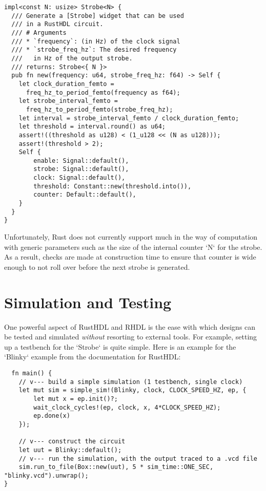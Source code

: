 \documentclass[conference]{IEEEtran}
\begin{document}
\begin{verbatim}
impl<const N: usize> Strobe<N> {
  /// Generate a [Strobe] widget that can be used 
  /// in a RustHDL circuit.
  /// # Arguments
  /// * `frequency`: (in Hz) of the clock signal 
  /// * `strobe_freq_hz`: The desired frequency 
  ///   in Hz of the output strobe.  
  /// returns: Strobe<{ N }>
  pub fn new(frequency: u64, strobe_freq_hz: f64) -> Self {
    let clock_duration_femto = 
      freq_hz_to_period_femto(frequency as f64);
    let strobe_interval_femto = 
      freq_hz_to_period_femto(strobe_freq_hz);
    let interval = strobe_interval_femto / clock_duration_femto;
    let threshold = interval.round() as u64;
    assert!((threshold as u128) < (1_u128 << (N as u128)));
    assert!(threshold > 2);
    Self {
        enable: Signal::default(),
        strobe: Signal::default(),
        clock: Signal::default(),
        threshold: Constant::new(threshold.into()),
        counter: Default::default(),
    }
  }
}
\end{verbatim}

Unfortunately, Rust does not currently support much in the way of computation with generic parameters such as the 
size of the internal counter `N` for the strobe.  As a result, checks are made at construction time to ensure that 
counter is wide enough to not roll over before the next strobe is generated.

\section{Simulation and Testing}

One powerful aspect of RustHDL and RHDL is the ease with which designs can be tested and simulated \emph{without} 
resorting to external tools.  For example, setting up a testbench for the `Strobe` is quite simple.  Here is an example
for the `Blinky` example from the documentation for RustHDL:

\begin{verbatim}
  fn main() {
    // v--- build a simple simulation (1 testbench, single clock)
    let mut sim = simple_sim!(Blinky, clock, CLOCK_SPEED_HZ, ep, {
        let mut x = ep.init()?;
        wait_clock_cycles!(ep, clock, x, 4*CLOCK_SPEED_HZ);
        ep.done(x)
    });

    // v--- construct the circuit
    let uut = Blinky::default();
    // v--- run the simulation, with the output traced to a .vcd file
    sim.run_to_file(Box::new(uut), 5 * sim_time::ONE_SEC, "blinky.vcd").unwrap();
}
\end{verbatim}
\end{document}
